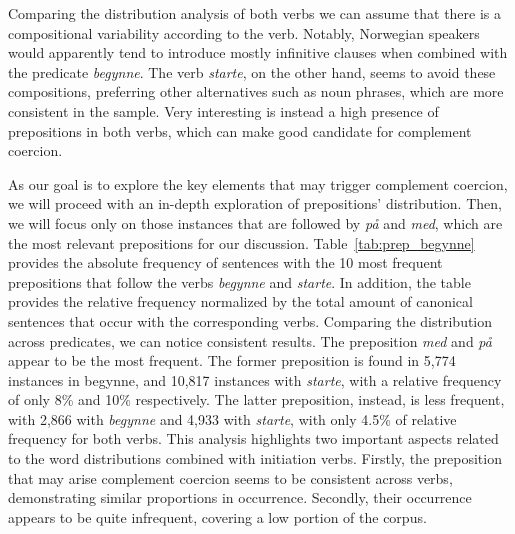 \documentclass{article}
\begin{document}
Comparing the distribution analysis of both verbs we can assume that there is a compositional variability according to the verb. Notably, Norwegian speakers would apparently tend to introduce mostly infinitive clauses when combined with the predicate \emph{begynne}. The verb \emph{starte}, on the other hand, seems to avoid these compositions, preferring other alternatives such as noun phrases, which are more consistent in the sample. Very interesting is instead a high presence of prepositions in both verbs, which can make good candidate for complement coercion. 

As our goal is to explore the key elements that may trigger complement coercion, we will proceed with an in-depth exploration of prepositions' distribution. Then, we will focus only on those instances that are followed by \emph{på} and \emph{med}, which are the most relevant prepositions for our discussion.
Table~\ref{tab:prep_begynne} provides the absolute frequency of sentences with the 10 most frequent prepositions that follow the verbs \emph{begynne} and \emph{starte}.
In addition, the table provides the relative frequency normalized by the total amount of canonical sentences that occur with the corresponding verbs. Comparing the distribution across predicates, we can notice consistent results. 
The preposition \emph{med} and \emph{på} appear to be the most frequent. The former preposition is found in 5,774 instances in begynne, and 10,817 instances with \emph{starte}, with a relative frequency of only 8\% and 10\% respectively. The latter preposition, instead, is less frequent, with 2,866 with \emph{begynne} and 4,933 with \emph{starte}, with only 4.5\% of relative frequency for both verbs. This analysis highlights two important aspects related to the word distributions combined with initiation verbs. Firstly, the preposition that may arise complement coercion seems to be consistent across verbs, demonstrating similar proportions in occurrence. Secondly, their occurrence appears to be quite infrequent, covering a low portion of the corpus.
\end{document}

